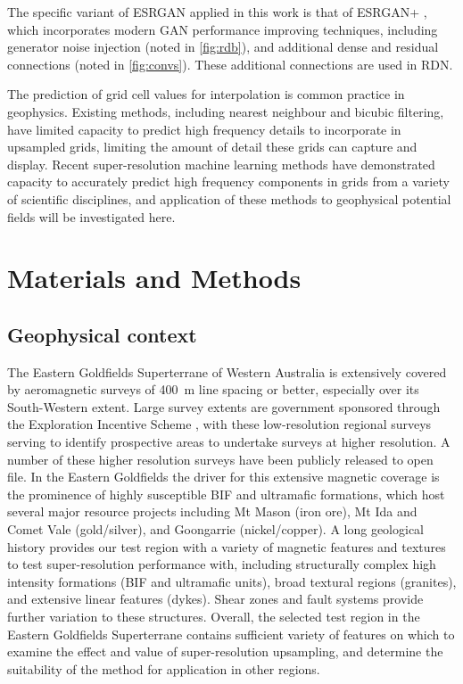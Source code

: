 \documentclass[manuscript.tex]{subfiles}
\begin{document}
The specific variant of ESRGAN applied in this work is that of ESRGAN+ \parencite{rakotonirinaESRGANFurtherImproving2020}, which incorporates modern GAN performance improving techniques, including generator noise injection (noted in \cref{fig:rdb}), and additional dense and residual connections (noted in \cref{fig:convs}).
These additional connections are used in RDN\textdaggerdbl{}.

The prediction of grid cell values for interpolation is common practice in geophysics.
Existing methods, including nearest neighbour and bicubic filtering, have limited capacity to predict high frequency details to incorporate in upsampled grids, limiting the amount of detail these grids can capture and display.
Recent super-resolution machine learning methods have demonstrated capacity to accurately predict high frequency components in grids from a variety of scientific disciplines, and application of these methods to geophysical potential fields will be investigated here.

\section{Materials and Methods}
\subsection{Geophysical context}
The Eastern Goldfields Superterrane of Western Australia is extensively covered by aeromagnetic surveys of \SI{400}{\metre} line spacing or better, especially over its South-Western extent.
Large survey extents are government sponsored through the Exploration Incentive Scheme \parencite[e.g.][]{griffinStimulatingGreenfieldsExploration2010}, with these low-resolution regional surveys serving to identify prospective areas to undertake surveys at higher resolution.
A number of these higher resolution surveys have been publicly released to open file.
In the Eastern Goldfields the driver for this extensive magnetic coverage is the prominence of highly susceptible BIF and ultramafic formations, which host several major resource projects including Mt Mason (iron ore), Mt Ida and Comet Vale (gold/silver), and Goongarrie (nickel/copper).
A long geological history provides our test region with a variety of magnetic features and textures to test super-resolution performance with, including structurally complex high intensity formations (BIF and ultramafic units), broad textural regions (granites), and extensive linear features (dykes).
Shear zones and fault systems provide further variation to these structures.
Overall, the selected test region in the Eastern Goldfields Superterrane contains sufficient variety of features on which to examine the effect and value of super-resolution upsampling, and determine the suitability of the method for application in other regions.
\end{document}
